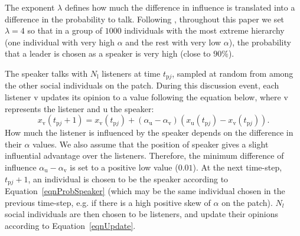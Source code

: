 \documentclass{rstb}
\begin{document}
\begin{linenumbers}
The exponent $\lambda$ defines how much the difference in influence is translated into a difference in the probability to talk. Following \cite{Perret:2020:a}, throughout this paper we set $\lambda = 4$ so that in a group of $1000$ individuals with the most extreme hierarchy (one individual with very high $\alpha$ and the rest with very low $\alpha$), the probability that a leader is chosen as a speaker is very high (close to $90\%$). 

The speaker talks with $N_\mathrm{l}$ listeners at time $t_{\mathrm{p}j}$, sampled at random from among the other social individuals on the patch. During this discussion event, each listener $\mathrm{v}$ updates its opinion to a value following the equation below, where $\mathrm{v}$ represents the listener and $\mathrm{u}$ the speaker:
\begin{equation}
x_\mathrm{v}(t_{\mathrm{p}j}+1) = x_\mathrm{v}(t_{\mathrm{p}j}) + (\alpha_\mathrm{u}-\alpha_\mathrm{v})(x_\mathrm{u}(t_{\mathrm{p}j}) - x_\mathrm{v}(t_{\mathrm{p}j})).
\label{eqnUpdate}
\end{equation}
How much the listener is influenced by the speaker depends on the difference in their $\alpha$ values. We also assume that the position of speaker gives a slight influential advantage over the listeners. Therefore, the minimum difference of influence $\alpha_\mathrm{u}-\alpha_\mathrm{v}$ is set to a positive low value ($0.01$). At the next time-step, $t_{\mathrm{p}j}+1$, an individual is chosen to be the speaker according to Equation~\ref{eqnProbSpeaker} (which may be the same individual chosen in the previous time-step, e.g. if there is a high positive skew of $\alpha$ on the patch). $N_l$ social individuals are then chosen to be listeners, and update their opinions according to Equation~\ref{eqnUpdate}. 



\end{linenumbers}
\end{document}
